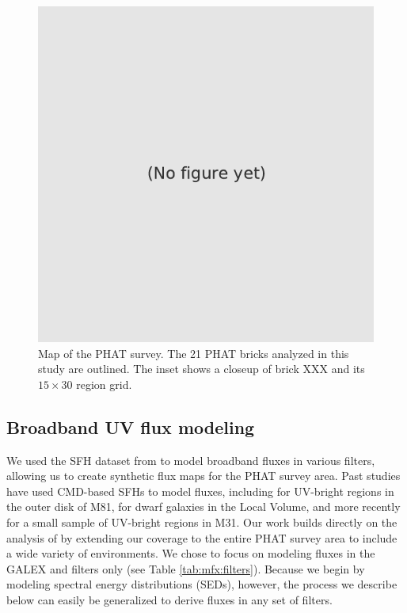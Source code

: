 \begin{figure}
\centering
\includegraphics[scale=1.0]{m31flux-figures/dummy.pdf}
\caption[PHAT survey map.]{Map of the PHAT survey. The 21 PHAT bricks analyzed
    in this study are outlined. The inset shows a closeup of brick XXX and its
    $15 \times 30$ region grid.
}
\label{fig:mfx:dummy1}
\end{figure}



\subsection{Broadband UV flux modeling}\label{mfx:syntheticfluxmaps:fluxmod}

We used the SFH dataset from \citet{Lewis:2014} to model broadband fluxes in
various filters, allowing us to create synthetic flux maps for the PHAT survey
area. Past studies have used CMD-based SFHs to model fluxes, including
\citet{Gogarten:2009} for UV-bright regions in the outer disk of M81,
\citet{Johnson:2013} for dwarf galaxies in the Local Volume, and more recently
\citet{Simones:2014} for a small sample of UV-bright regions in M31. Our work
builds directly on the analysis of \citet{Simones:2014} by extending our
coverage to the entire PHAT survey area to include a wide variety of
environments. We chose to focus on modeling fluxes in the GALEX \fuv{} and
\nuv{} filters only (see Table \ref{tab:mfx:filters}). Because we begin by
modeling spectral energy distributions (SEDs), however, the process we describe
below can easily be generalized to derive fluxes in any set of filters.

